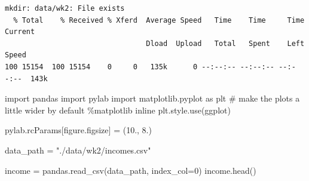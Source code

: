 \documentclass[
  letterpaper,
  DIV=11,
  numbers=noendperiod]{scrreprt}
\newenvironment{Shaded}{\begin{snugshade}}{\end{snugshade}}
\newcommand{\CommentTok}[1]{\textcolor[rgb]{0.37,0.37,0.37}{#1}}
\newcommand{\DecValTok}[1]{\textcolor[rgb]{0.68,0.00,0.00}{#1}}
\newcommand{\FloatTok}[1]{\textcolor[rgb]{0.68,0.00,0.00}{#1}}
\newcommand{\ImportTok}[1]{\textcolor[rgb]{0.00,0.46,0.62}{#1}}
\newcommand{\NormalTok}[1]{\textcolor[rgb]{0.00,0.23,0.31}{#1}}
\newcommand{\OperatorTok}[1]{\textcolor[rgb]{0.37,0.37,0.37}{#1}}
\newcommand{\StringTok}[1]{\textcolor[rgb]{0.13,0.47,0.30}{#1}}
\begin{document}
\begin{verbatim}
mkdir: data/wk2: File exists
  % Total    % Received % Xferd  Average Speed   Time    Time     Time  Current
                                 Dload  Upload   Total   Spent    Left  Speed
100 15154  100 15154    0     0   135k      0 --:--:-- --:--:-- --:--:--  143k
\end{verbatim}

\begin{Shaded}
\begin{Highlighting}[]
\ImportTok{import}\NormalTok{ pandas}
\ImportTok{import}\NormalTok{ pylab}
\ImportTok{import}\NormalTok{ matplotlib.pyplot }\ImportTok{as}\NormalTok{ plt}
\CommentTok{\# make the plots a little wider by default}
\OperatorTok{\%}\NormalTok{matplotlib inline}
\NormalTok{plt.style.use(}\StringTok{\textquotesingle{}ggplot\textquotesingle{}}\NormalTok{)}

\NormalTok{pylab.rcParams[}\StringTok{\textquotesingle{}figure.figsize\textquotesingle{}}\NormalTok{] }\OperatorTok{=}\NormalTok{ (}\FloatTok{10.}\NormalTok{, }\FloatTok{8.}\NormalTok{)}
\end{Highlighting}
\end{Shaded}

\begin{Shaded}
\begin{Highlighting}[]
\NormalTok{data\_path }\OperatorTok{=} \StringTok{"./data/wk2/incomes.csv"}

\NormalTok{income }\OperatorTok{=}\NormalTok{  pandas.read\_csv(data\_path, index\_col}\OperatorTok{=}\DecValTok{0}\NormalTok{)}
\NormalTok{income.head()}
\end{Highlighting}
\end{Shaded}
\end{document}
